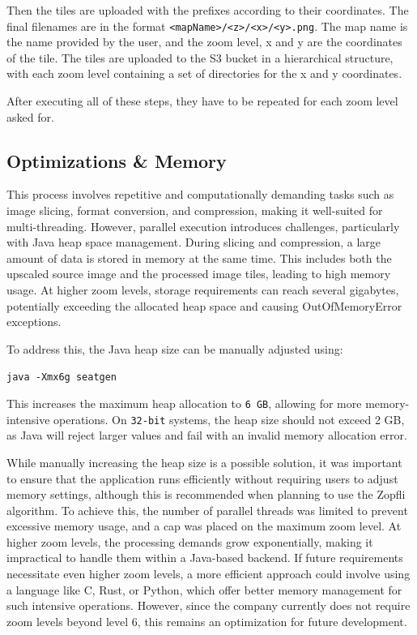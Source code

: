 Then the tiles are uploaded with the prefixes according to their coordinates. The final filenames are in the format \texttt{<mapName>/<z>/<x>/<y>.png}. The map name is the name provided by the user, and the zoom level, x and y are the coordinates of the tile. The tiles are uploaded to the S3 bucket in a hierarchical structure, with each zoom level containing a set of directories for the x and y coordinates.

After executing all of these steps, they have to be repeated for each zoom level asked for. 

\subsection{Optimizations \& Memory}

This process involves repetitive and computationally demanding tasks such as image slicing, format conversion, and compression, making it well-suited for multi-threading. However, parallel execution introduces challenges, particularly with Java heap space management. During slicing and compression, a large amount of data is stored in memory at the same time. This includes both the upscaled source image and the processed image tiles, leading to high memory usage. At higher zoom levels, storage requirements can reach several gigabytes, potentially exceeding the allocated heap space and causing OutOfMemoryError exceptions.

To address this, the Java heap size can be manually adjusted using:

\texttt{java -Xmx6g seatgen}

This increases the maximum heap allocation to \texttt{6 GB}, allowing for more memory-intensive operations. On \texttt{32-bit} systems, the heap size should not exceed 2 GB, as Java will reject larger values and fail with an invalid memory allocation error.

While manually increasing the heap size is a possible solution, it was important to ensure that the application runs efficiently without requiring users to adjust memory settings, although this is recommended when planning to use the Zopfli algorithm. To achieve this, the number of parallel threads was limited to prevent excessive memory usage, and a cap was placed on the maximum zoom level. At higher zoom levels, the processing demands grow exponentially, making it impractical to handle them within a Java-based backend. If future requirements necessitate even higher zoom levels, a more efficient approach could involve using a language like C, Rust, or Python, which offer better memory management for such intensive operations. However, since the company currently does not require zoom levels beyond level 6, this remains an optimization for future development.

